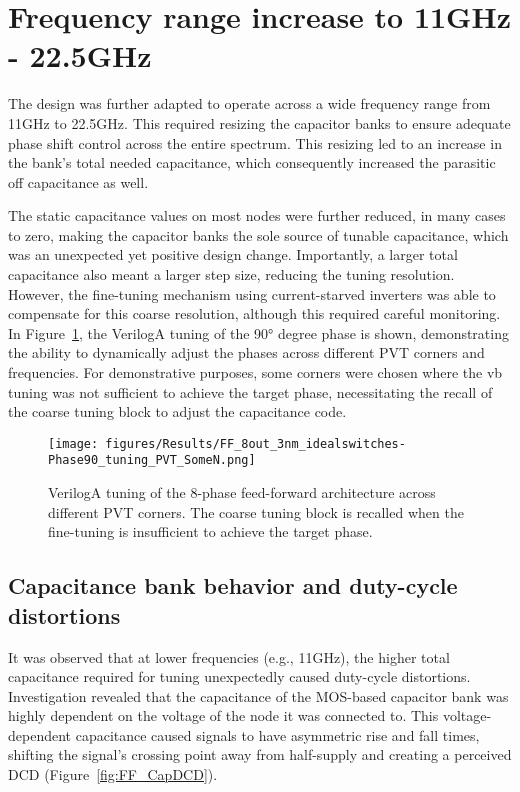 \section{Frequency range increase to 11GHz - 22.5GHz}\label{sec:freq_range}

The design was further adapted to operate across a wide frequency range from 11GHz to 22.5GHz. This required resizing the capacitor banks to ensure adequate phase shift control across the entire spectrum. This resizing led to an increase in the bank's total needed capacitance, which consequently increased the parasitic off capacitance as well.

The static capacitance values on most nodes were further reduced, in many cases to zero, making the capacitor banks the sole source of tunable capacitance, which was an unexpected yet positive design change. Importantly, a larger total capacitance also meant a larger step size, reducing the tuning resolution. However, the fine-tuning mechanism using current-starved inverters was able to compensate for this coarse resolution, although this required careful monitoring. In Figure~\ref{fig:FF_8out_CSI_dynamicTuning_PVT}, the VerilogA tuning of the \ang{90} degree phase is shown, demonstrating the ability to dynamically adjust the phases across different PVT corners and frequencies. For demonstrative purposes, some corners were chosen where the vb tuning was not sufficient to achieve the target phase, necessitating the recall of the coarse tuning block to adjust the capacitance code.

\begin{figure}[H]
  \centering
  \texttt{[image: figures/Results/FF\_8out\_3nm\_idealswitches-Phase90\_tuning\_PVT\_SomeN.png]}
  \caption{VerilogA tuning of the 8-phase feed-forward architecture across different PVT corners. The coarse tuning block is recalled when the fine-tuning is insufficient to achieve the target phase.}
  \label{fig:FF_8out_CSI_dynamicTuning_PVT}
\end{figure}

\subsection{Capacitance bank behavior and duty-cycle distortions}

It was observed that at lower frequencies (e.g., 11GHz), the higher total capacitance required for tuning unexpectedly caused duty-cycle distortions. Investigation revealed that the capacitance of the MOS-based capacitor bank was highly dependent on the voltage of the node it was connected to. This voltage-dependent capacitance caused signals to have asymmetric rise and fall times, shifting the signal's crossing point away from half-supply and creating a perceived DCD (Figure~\ref{fig:FF_CapDCD}).

